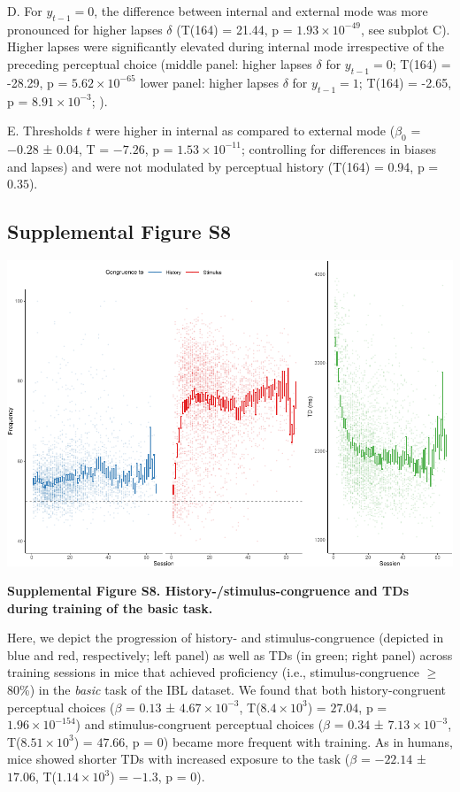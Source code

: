 \documentclass[
]{article}
\begin{document}
D. For \(y_{t-1} = 0\), the difference between internal and external
mode was more pronounced for higher lapses \(\delta\) (T(164) = 21.44, p
= \(\ensuremath{1.93\times 10^{-49}}\), see subplot C). Higher lapses
were significantly elevated during internal mode irrespective of the
preceding perceptual choice (middle panel: higher lapses \(\delta\) for
\(y_{t-1} = 0\); T(164) = -28.29, p =
\(\ensuremath{5.62\times 10^{-65}}\) lower panel: higher lapses
\(\delta\) for \(y_{t-1} = 1\); T(164) = -2.65, p =
\(\ensuremath{8.91\times 10^{-3}}\); ).

E. Thresholds \(t\) were higher in internal as compared to external mode
(\(\beta_0\) = \(-0.28\) ± \(0.04\), T = \(-7.26\), p =
\(\ensuremath{1.53\times 10^{-11}}\); controlling for differences in
biases and lapses) and were not modulated by perceptual history (T(164)
= 0.94, p = \(0.35\)).

\newpage

\hypertarget{supplemental-figure-s8}{%
\subsection{Supplemental Figure S8}\label{supplemental-figure-s8}}

\includegraphics{modes_mouse_rev1b_files/figure-latex/Supplemental_Figure_S8-1.pdf}

\textbf{Supplemental Figure S8. History-/stimulus-congruence and TDs
during training of the basic task.}

Here, we depict the progression of history- and stimulus-congruence
(depicted in blue and red, respectively; left panel) as well as TDs (in
green; right panel) across training sessions in mice that achieved
proficiency (i.e., stimulus-congruence \(\geq\) 80\%) in the
\emph{basic} task of the IBL dataset. We found that both
history-congruent perceptual choices (\(\beta\) = \(0.13\) ±
\(\ensuremath{4.67\times 10^{-3}}\),
T(\(\ensuremath{8.4\times 10^{3}}\)) = \(27.04\), p =
\(\ensuremath{1.96\times 10^{-154}}\)) and stimulus-congruent perceptual
choices (\(\beta\) = \(0.34\) ± \(\ensuremath{7.13\times 10^{-3}}\),
T(\(\ensuremath{8.51\times 10^{3}}\)) = \(47.66\), p = \(0\)) became
more frequent with training. As in humans, mice showed shorter TDs with
increased exposure to the task (\(\beta\) = \(-22.14\) ± \(17.06\),
T(\(\ensuremath{1.14\times 10^{3}}\)) = \(-1.3\), p = \(0\)).
\end{document}
